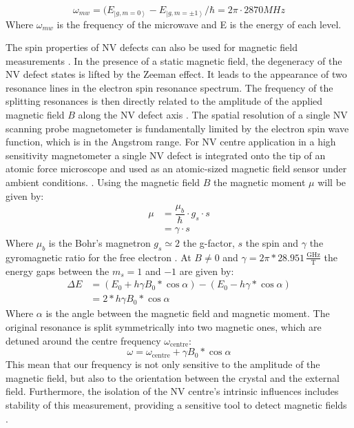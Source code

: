 \begin{equation}
\omega_{mw}=(E_{\left|g,m=0\right\rangle}-E_{\left|g,m=\pm 1\right\rangle}/ \hbar = 2\pi \cdot 2870MHz 
\end{equation}
Where $\omega_{mw}$ is the frequency of the microwave and E is the energy of each level.

The spin properties of NV defects can also be used for magnetic field measurements \cite{sage_optical_2013}. In the presence of a static magnetic field, the degeneracy of the NV defect states is lifted by the Zeeman effect. It leads to the appearance of two resonance lines in the electron spin resonance spectrum. The frequency of the splitting resonances is then directly related to the amplitude of the applied magnetic field $B$ along the NV defect axis \cite{lesik_engineering_2015}. The spatial resolution of a single NV scanning probe magnetometer is fundamentally limited by the electron spin wave function, which is in the Angstrom range. For NV centre application in a high sensitivity magnetometer a single NV defect is integrated onto the tip of an atomic force microscope and used as an atomic-sized magnetic field sensor under ambient conditions. \cite{zhou_scanning_2017}.
Using the magnetic field $B$ the magnetic moment $\mu$ will be given by:
\begin{align}
\mu&=\dfrac{\mu_{b}}{\hbar}\cdot g_{s}\cdot s \\
&=\gamma\cdot s
\end{align}
Where $\mu_{b}$ is the Bohr's magnetron $g_{s}\simeq 2$ the g-factor, $s$ the spin and $\gamma$ the gyromagnetic ratio for the free electron \cite{meschede_gerthsen_2015}. At $B\neq 0$ and $\gamma=2\pi*28.951\,\mathrm{\frac{GHz}{T}}$ the energy gaps between the $m_{s}=1$ and $-1$ are given by:
\begin{align}
	\Delta E&=(E_{0}+h \gamma B_{0}*\cos\alpha)-(E_{0}-h \gamma*\cos\alpha) \\	
	&=2*h \gamma B_{0}*\cos\alpha
\end{align}
Where $\alpha $ is the angle between the magnetic field and magnetic moment. The original resonance is split symmetrically into two magnetic ones, which are detuned around the centre frequency $\omega_\text{centre}$:
\begin{equation}
	\omega=\omega_\text{centre}+\gamma B_{0}*\cos\alpha
\end{equation}
This mean that our frequency is not only sensitive to the amplitude of the magnetic field, but also to the orientation between the crystal and the external field. Furthermore, the isolation of the NV centre's intrinsic influences includes stability of this measurement, providing a sensitive tool to detect magnetic fields \cite{meschede_gerthsen_2015}.

